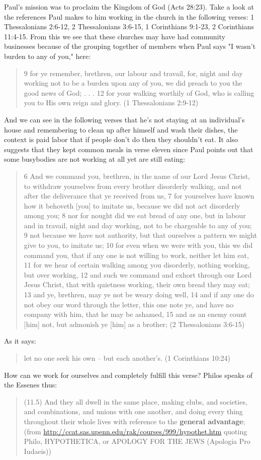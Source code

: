 \documentclass[11pt]{article}
\begin{document}
Paul's mission was to proclaim the Kingdom of God (Acts 28:23). Take a look at the references Paul makes to him working in the church in the following verses: 1 Thessalonians 2:6-12, 2 Thessalonians 3:6-15, 1 Corinthians 9:1-23, 2 Corinthians 11:4-15. From this we see that these churches may have had community businesses because of the grouping together of members when Paul says "I wasn't burden to any of you," here:
\begin{quote}
 9 for ye remember, brethren, our labour and travail, for, night and day working not to be a burden upon any of you, we did preach to you the good news of God; . . . 12 for your walking worthily of God, who is calling you to His own reign and glory. (1 Thessalonians 2:9-12) 
\end{quote}
And we can see in the following verses that he's not staying at an individual's house and remembering to clean up after himself and wash their dishes, the context is paid labor that if people don't do then they shouldn't eat. It also suggests that they kept common meals in verse eleven since Paul points out that some busybodies are not working at all yet are still eating:
\begin{quote}
6 And we command you, brethren, in the name of our Lord Jesus Christ, to withdraw yourselves from every brother disorderly walking, and not after the deliverance that ye received from us,
7 for yourselves have known how it behoveth [you] to imitate us, because we did not act disorderly among you;
8 nor for nought did we eat bread of any one, but in labour and in travail, night and day working, not to be chargeable to any of you;
9 not because we have not authority, but that ourselves a pattern we might give to you, to imitate us;
10 for even when we were with you, this we did command you, that if any one is not willing to work, neither let him eat,
11 for we hear of certain walking among you disorderly, nothing working, but over working,
12 and such we command and exhort through our Lord Jesus Christ, that with quietness working, their own bread they may eat;
13 and ye, brethren, may ye not be weary doing well,
14 and if any one do not obey our word through the letter, this one note ye, and have no company with him, that he may be ashamed,
15 and as an enemy count [him] not, but admonish ye [him] as a brother; (2 Thessalonians 3:6-15)
\end{quote}
As it says:
\begin{quote}
let no one seek his own -- but each another's. (1 Corinthians 10:24)
\end{quote}
How can we work for ourselves and completely fulfill this verse? Philos speaks of the Essenes thus:
\begin{quote}
(11.5) And they all dwell in the same place, making clubs, and societies, and combinations, and unions with one another, and doing every thing throughout their whole lives with reference to the \textbf{general advantage}; (from \url{http://ccat.sas.upenn.edu/rak/courses/999/hypothet.htm} quoting Philo, HYPOTHETICA, or APOLOGY FOR THE JEWS (Apologia Pro Iudaeis)) 
\end{quote}
\end{document}
